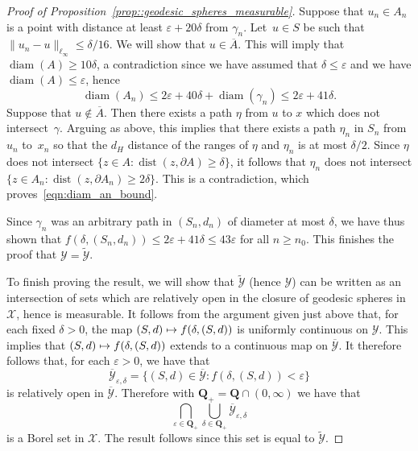 \documentclass[JEP,XML,SOM,Unicode]{cedram}
\let\mathcal\mathscr
\newcommand\mto{\mathchoice{\longmapsto}{\mapsto}{\mapsto}{\mapsto}}
\let\epsilon\varepsilon
\theoremstyle{plain}
\numberwithin{theorem}{section}
\theoremstyle{definition}
\newcommand{\Q}{{\mathbf Q}}
\DeclareMathOperator{\dist}{dist}
\DeclareMathOperator{\diam}{diam}
\newcommand{\gh}{{\mathcal X}}
\newcommand{\spheresgeo}{{\mathcal Y}}
\newcommand{\spheresgeoclose}{\ol{\spheresgeo}}
\let\ol\overline
\let\wt\widetilde
\begin{document}
\begin{proof}[Proof of Proposition~\ref{prop::geodesic_spheres_measurable}]
Suppose that $u_n \in A_n$ is a point with distance at least $\epsilon+20\delta$ from $\gamma_n$. Let~\hbox{$u \in S$} be such that $\|u_n - u\|_{\ell_\infty} \leq \delta/16$. We will show that $u \in \ol{A}$. This will imply that $\diam(A) \geq 10\delta$, a contradiction since we have assumed that $\delta \leq \epsilon$ and we have $\diam(A) \leq \epsilon$, hence
\begin{equation}
\label{eqn:diam_an_bound}
\diam(A_n) \leq 2\epsilon + 40\delta + \diam(\gamma_n) \leq 2\epsilon + 41\delta.	
\end{equation}
Suppose that $u \notin \ol{A}$. Then there exists a path $\eta$ from $u$ to $x$ which does not intersect~$\gamma$. Arguing as above, this implies that there exists a path $\eta_n$ in $S_n$ from~$u_n$ to~$x_n$ so that the $d_H$ distance of the ranges of $\eta$ and $\eta_n$ is at most $\delta/2$. Since $\eta$ does not intersect \hbox{$\{z \in A : \dist(z,\partial A) \geq \delta\}$}, it follows that $\eta_n$ does not intersect \hbox{$\{z \in A_n : \dist(z,\partial A_n) \geq 2\delta\}$}. This is a contradiction, which proves~\eqref{eqn:diam_an_bound}.

Since $\gamma_n$ was an arbitrary path in $(S_n,d_n)$ of diameter at most $\delta$, we have thus shown that $f(\delta,(S_n,d_n)) \leq 2\epsilon+41\delta \leq 43\epsilon$ for all $n \geq n_0$. This finishes the proof that $\spheresgeo = \wt{\spheresgeo}$.

To finish proving the result, we will show that $\wt{\spheresgeo}$ (hence $\spheresgeo$) can be written as an intersection of sets which are relatively open in the closure of geodesic spheres in $\gh$, hence is measurable. It follows from the argument given just above that, for each fixed $\delta > 0$, the map $(S,d) \mto f(\delta, (S,d))$ is uniformly continuous on $\spheresgeo$. This implies that $(S,d) \mto f(\delta, (S,d))$ extends to a continuous map on $\spheresgeoclose$. It therefore follows that, for each $\epsilon > 0$, we have that
\[
\ol{\spheresgeo}_{\epsilon,\delta} = \{ (S,d) \in \spheresgeoclose : f(\delta, (S,d)) < \epsilon\}
\]
is relatively open in $\spheresgeoclose$. Therefore with $\Q_+ = \Q \cap (0,\infty)$ we have that
\[
\bigcap_{\epsilon \in \Q_+} \bigcup_{\delta \in \Q_+} \ol{\spheresgeo}_{\epsilon,\delta}
\]
is a Borel set in $\gh$. The result follows since this set is equal to $\wt{\spheresgeo}$.
\end{proof}
\end{document}
